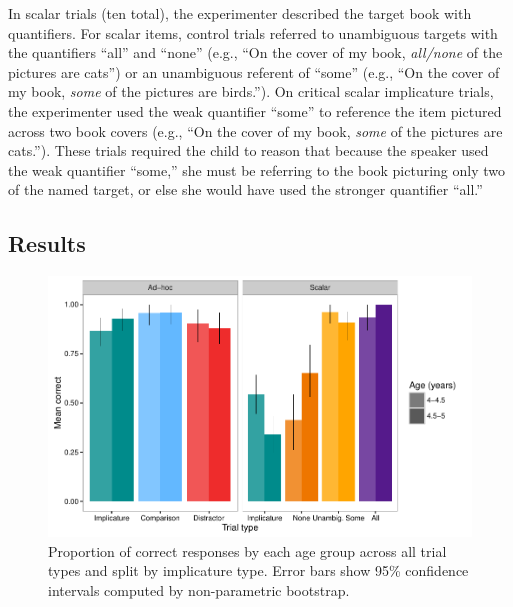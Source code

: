 \documentclass[man]{apa2}
\begin{document}
In scalar trials (ten total), the experimenter described the target book with quantifiers. For scalar items, control trials referred to unambiguous targets with the quantifiers ``all'' and ``none'' (e.g., ``On the cover of my book, \textit{all/none} of the pictures are cats'') or an unambiguous referent of ``some'' (e.g., ``On the cover of my book, \textit{some} of the pictures are birds.''). On critical scalar implicature trials, the experimenter used the weak quantifier ``some'' to reference the item pictured across two book covers (e.g., ``On the cover of my book, \textit{some} of the pictures are cats.''). These trials required the child to reason that because the speaker used the weak quantifier ``some,'' she must be referring to the book picturing only two of the named target, or else she would have used the stronger quantifier ``all.''

\subsection{Results}

\begin{figure}
 \begin{center}
  \includegraphics[width=6in]{figures/exp1_performance.pdf}
  \caption{\label{fig:exp1_perf} Proportion of correct responses by each age group across all trial types and split by implicature type. Error bars show 95\% confidence intervals computed by non-parametric bootstrap.}
 \end{center}
\end{figure}
\end{document}
